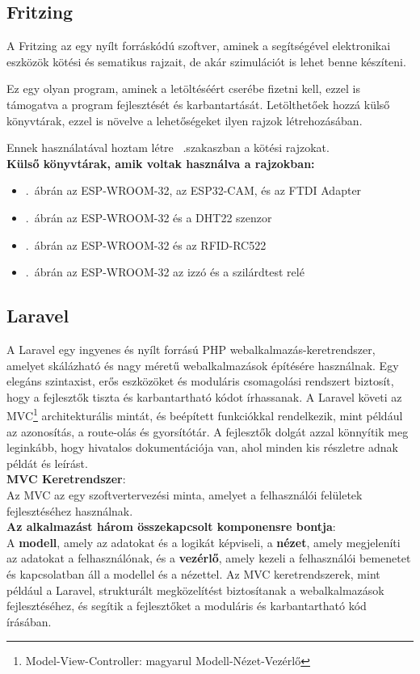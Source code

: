 \documentclass[
]{thesis-ekf}
\theoremstyle{definition}
\theoremstyle{remark}
\begin{document}
	\subsection{Fritzing}
	A Fritzing az egy nyílt forráskódú szoftver, aminek a segítségével elektronikai eszközök kötési és sematikus rajzait, de akár szimulációt is lehet benne készíteni.
	
	Ez egy olyan program, aminek a letöltéséért cserébe fizetni kell, ezzel is támogatva a program fejlesztését és karbantartását. Letölthetőek hozzá külső könyvtárak, ezzel is növelve a lehetőségeket ilyen rajzok létrehozásában.
	
	Ennek használatával hoztam létre ~.szakaszban a kötési rajzokat.\\
	\textbf{Külső könyvtárak, amik voltak használva a rajzokban:}
	\begin{itemize}
		\item {}.~ábrán az ESP-WROOM-32, az ESP32-CAM, és az FTDI Adapter\cite{fritzing-library}
		\item {}.~ábrán az ESP-WROOM-32 és a DHT22 szenzor \cite{fritzing-library}
		\item {}.~ábrán az ESP-WROOM-32\cite{fritzing-library} és az RFID-RC522\cite{fritzing-rfid}
		\item {}.~ábrán az ESP-WROOM-32\cite{fritzing-library} az izzó\cite{fritzing-light} és a szilárdtest relé\cite{fritzing-SSR}
	\end{itemize}
	\subsection{Laravel}
	A Laravel egy ingyenes és nyílt forrású PHP webalkalmazás-keretrendszer, amelyet skálázható és nagy méretű webalkalmazások építésére használnak. Egy elegáns szintaxist, erős eszközöket és moduláris csomagolási rendszert biztosít, hogy a fejlesztők tiszta és karbantartható kódot írhassanak. A Laravel követi az MVC\footnote{Model-View-Controller: magyarul Modell-Nézet-Vezérlő} architekturális mintát, és beépített funkciókkal rendelkezik, mint például az azonosítás, a route-olás és gyorsítótár.\cite{laravel-intro}
	A fejlesztők dolgát azzal könnyítik meg leginkább, hogy hivatalos dokumentációja van, ahol minden kis részletre adnak példát és leírást.\cite{laravel-docs}\\
	\textbf{MVC Keretrendszer}:\\
	Az MVC az egy szoftvertervezési minta, amelyet a felhasználói felületek fejlesztéséhez használnak. \\
	\textbf{Az alkalmazást három összekapcsolt komponensre bontja}:\\A \textbf{modell}, amely az adatokat és a logikát képviseli, a \textbf{nézet}, amely megjeleníti az adatokat a felhasználónak, és a \textbf{vezérlő}, amely kezeli a felhasználói bemenetet és kapcsolatban áll a modellel és a nézettel. Az MVC keretrendszerek, mint például a Laravel, strukturált megközelítést biztosítanak a webalkalmazások fejlesztéséhez, és segítik a fejlesztőket a moduláris és karbantartható kód írásában.
	
\end{document}
